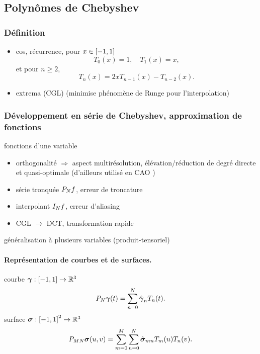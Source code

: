 \subsection{Polynômes de Chebyshev}

\subsubsection{Définition}
	\begin{itemize}
		\item cos, récurrence, pour $x \in \chebinterval$ 
		\begin{equation*}
			T_0(x) = 1, \quad T_1(x) = x,
		\end{equation*}				
		et pour $n \geq 2$,
		\begin{equation}
			T_n(x) = 2x T_{n-1}(x) - T_{n-2}(x).
			\label{eq:recurrence_chebyshev}
		\end{equation}
		\item extrema (CGL) (minimise phénomène de Runge pour l'interpolation)
	\end{itemize}
	
\subsubsection{Développement en série de Chebyshev, approximation de fonctions}
fonctions d'une variable
\begin{itemize}
	\item orthogonalité $\Rightarrow$ aspect multirésolution, élévation/réduction de degré directe et quasi-optimale (d'ailleurs utilisé en CAO \cite{lachance1988})
	\item série tronquée $\truncseries{f}{N}$, erreur de troncature
	\item interpolant $\interpolant{f}{N}$, erreur d'aliasing
	\item CGL $\to$ DCT, transformation rapide
\end{itemize}
généralisation à plusieurs variables (produit-tensoriel)

\paragraph{Représentation de courbes et de surfaces.}
courbe $\bg : \chebinterval \to \mathbb{R}^3$
\begin{equation}
	\truncseries{\bg}{N}(t) = \sum_{n=0}^{N} \hat{\bg}_{n} T_n(t).
\end{equation}
surface $\bs : \chebinterval^2 \to \mathbb{R}^3$
\begin{equation}
	\truncseries{\bs}{MN}(u,v) = \sum_{m=0}^{M} \sum_{n=0}^{N} \hat{\bs}_{mn} T_m(u) T_n(v).
\end{equation}

